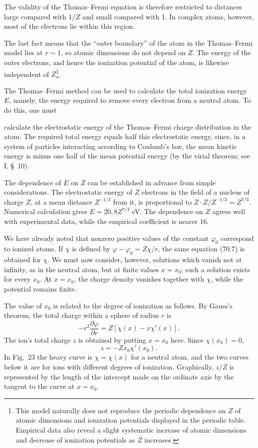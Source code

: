 The validity of the Thomas--Fermi equation is therefore restricted to distances large compared with $1/Z$ and small compared with 1. In complex atoms, however, most of the electrons lie within this region.

The last fact means that the ``outer boundary'' of the atom in the Thomas--Fermi model lies at $r\sim1$, so atomic dimensions do not depend on $Z$. The energy of the outer electrons, and hence the ionization potential of the atom, is likewise independent of $Z$\footnote{This model naturally does not reproduce the periodic dependence on $Z$ of atomic dimensions and ionization potentials displayed in the periodic table. Empirical data also reveal a slight systematic increase of atomic dimensions and decrease of ionization potentials as $Z$ increases.}.

The Thomas--Fermi method can be used to calculate the total ionization energy $E$, namely, the energy required to remove every electron from a neutral atom. To do this, one must

calculate the electrostatic energy of the Thomas--Fermi charge distribution in the atom. The required total energy equals half this electrostatic energy, since, in a system of particles interacting according to Coulomb's law, the mean kinetic energy is minus one half of the mean potential energy (by the virial theorem; see I, \S~10).

The dependence of $E$ on $Z$ can be established in advance from simple considerations. The electrostatic energy of $Z$ electrons in the field of a nucleus of charge $Z$, at a mean distance $Z^{-1/3}$ from it, is proportional to $Z\cdot Z/Z^{-1/3}=Z^{7/3}$. Numerical calculation gives $E=20{,}8Z^{7/3}$ eV. The dependence on $Z$ agrees well with experimental data, while the empirical coefficient is nearer 16.

We have already noted that nonzero positive values of the constant $\varphi_0$ correspond to ionized atoms. If $\chi$ is defined by $\varphi-\varphi_0=Z\chi/r$, the same equation (70.7) is obtained for $\chi$. We must now consider, however, solutions which vanish not at infinity, as in the neutral atom, but at finite values $x=x_0$; such a solution exists for every $x_0$. At $x=x_0$, the charge density vanishes together with $\chi$, while the potential remains finite.

The value of $x_0$ is related to the degree of ionization as follows. By Gauss's theorem, the total charge within a sphere of radius $r$ is
\[-r^2\frac{\partial\varphi}{\partial r}=Z[\chi(x)-x\chi'(x)].\]
The ion's total charge $z$ is obtained by putting $x=x_0$ here. Since $\chi(x_0)=0$,
\begin{equation}z=-Zx_0\chi'(x_0).\tag{70.10}\end{equation}
In Fig.~23 the heavy curve is $\chi=\chi(x)$ for a neutral atom, and the two curves below it are for ions with different degrees of ionization. Graphically, $z/Z$ is represented by the length of the intercept made on the ordinate axis by the tangent to the curve at $x=x_0$.

